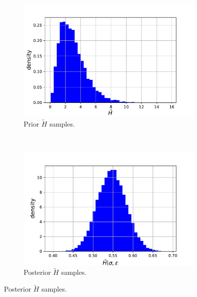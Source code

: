 \documentclass{article}
\begin{document}
\begin{figure}[htb!]
		\begin{subfigure}[b]{0.45\textwidth}
			\centering
			\includegraphics[width=\textwidth]{Q3a_3.pdf}
			\caption{Prior $\tilde{H}$ samples.}
		\end{subfigure}
		~
		\begin{subfigure}[b]{0.45\textwidth}
			\centering
			\includegraphics[width=\textwidth]{Q3a_8.pdf}
			\caption{Posterior $\tilde{H}$ samples.}
		\end{subfigure}
	

\end{figure}
\end{document}
